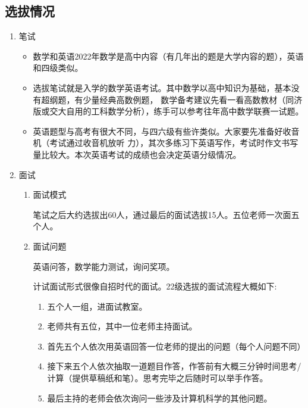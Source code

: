 \documentclass[zihao=-4,fontset=none]{Beautybook-CN}
\begin{document}
\subsection{选拔情况} 
\begin{enumerate}
	\item 笔试
 \begin{itemize}
     \item 数学和英语2022年数学是高中内容（有几年出的题是大学内容的题），英语和四级类似。
	      	      
	     \item  选拔笔试就是入学的数学英语考试。其中数学以高中知识为基础，基本没有超纲题，有少量经典高数例题， 数学备考建议先看一看高数教材（同济版或交大自用的工科数学分析），练手可以参考往年高中数学联赛一试题。
	      	      
	     \item  英语题型与高考有很大不同，与四六级有些许类似。大家要先准备好收音机（考试通过收音机放听 力），其次多练习下英语写作，考试时作文书写量比较大。本次英语考试的成绩也会决定英语分级情况。
 \end{itemize}
	      
	      	      
	\item 面试
	      \begin{enumerate}
	      	\item 面试模式
	      	      	      	          
	      	      笔试之后大约选拔出60人，通过最后的面试选拔15人。五位老师一次面五个人。
	      	      	      	          
	      	\item 面试问题
	      	      	      	          
	      	      英语问答，数学能力测试，询问奖项。
	      	      	      	          
	      	      计试面试形式很像自招时代的面试。22级选拔的面试流程大概如下:
	      	      \begin{enumerate}
	      	      	\item 五个人一组，进面试教室。
	      	      	\item 老师共有五位，其中一位老师主持面试。
	      	      	\item 首先五个人依次用英语回答一位老师的提出的问题（每个人问题不同）
	      	      	\item 接下来五个人依次抽取一道题目作答，作答前有大概三分钟时间思考/计算（提供草稿纸和笔）。思考完毕之后随时可以举手作答。
	      	      	\item 最后主持的老师会依次询问一些涉及计算机科学的其他问题。
	      	      \end{enumerate}
	      	      	      	          

\end{enumerate}
\end{enumerate}
\end{document}
